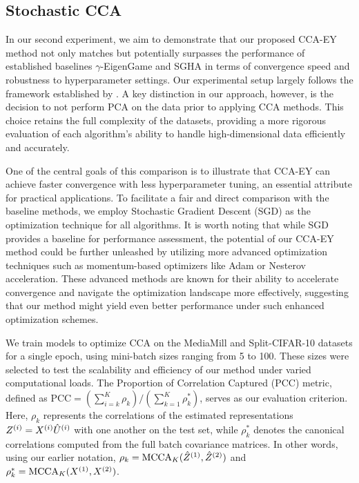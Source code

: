 \subsection{Stochastic CCA}
In our second experiment, we aim to demonstrate that our proposed CCA-EY method not only matches but potentially surpasses the performance of established baselines $\gamma$-EigenGame and SGHA in terms of convergence speed and robustness to hyperparameter settings.
Our experimental setup largely follows the framework established by \citet{meng2021online, gemp2022generalized}.
A key distinction in our approach, however, is the decision to not perform PCA on the data prior to applying CCA methods.
This choice retains the full complexity of the datasets, providing a more rigorous evaluation of each algorithm's ability to handle high-dimensional data efficiently and accurately.

One of the central goals of this comparison is to illustrate that CCA-EY can achieve faster convergence with less hyperparameter tuning, an essential attribute for practical applications.
To facilitate a fair and direct comparison with the baseline methods, we employ Stochastic Gradient Descent (SGD) as the optimization technique for all algorithms.
It is worth noting that while SGD provides a baseline for performance assessment, the potential of our CCA-EY method could be further unleashed by utilizing more advanced optimization techniques such as momentum-based optimizers like Adam or Nesterov acceleration.
These advanced methods are known for their ability to accelerate convergence and navigate the optimization landscape more effectively, suggesting that our method might yield even better performance under such enhanced optimization schemes.

We train models to optimize CCA on the MediaMill and Split-CIFAR-10 datasets for a single epoch, using mini-batch sizes ranging from 5 to 100.
These sizes were selected to test the scalability and efficiency of our method under varied computational loads. The Proportion of Correlation Captured (PCC) metric, defined as \( \text{PCC} = (\sum_{i=k}^K \rho_k)/ ({\sum_{k=1}^K \rho_k^*}) \), serves as our evaluation criterion.
Here, $\rho_k$ represents the correlations of the estimated representations $Z^{(i)}=X^{(i)}\hat{U}^{(i)}$ with one another on the test set, while $\rho_k^*$ denotes the canonical correlations computed from the full batch covariance matrices.
In other words, using our earlier notation, $\rho_k = \operatorname{MCCA}_K(\hat{Z}^{(1)}, \hat{Z}^{(2)})$ and $\rho_k^* = \operatorname{MCCA}_K(X^{(1)}, X^{(2)})$.

